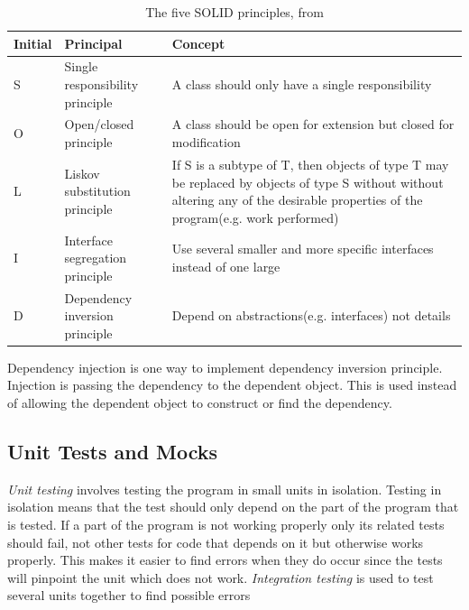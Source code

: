 \documentclass[10pt,a4paper]{report}
\begin{document}
\begin{table}[h]
\begin{tabular}{ l l p{2in}}
  \hline
  Initial & Principal & Concept\\
  \hline
  S & Single responsibility principle & A class should only have a single responsibility \\
  O & Open/closed principle & A class should be open for extension but closed for modification \\
  L & Liskov substitution principle & If S is a subtype of T, then objects of type T may be replaced by objects of type S without without altering any of the desirable properties of the program(e.g. work performed)\\
  I & Interface segregation principle & Use several smaller and more specific interfaces instead of one large \\
  D & Dependency inversion principle & Depend on abstractions(e.g. interfaces) not details \\
  \hline  
\end{tabular}
\caption{The five SOLID principles, from \cite{cleancode2008}}
\label{table:solid_table}
\end{table}

Dependency injection is one way to implement dependency inversion principle\cite{cleancode2008}. Injection is passing the dependency to the dependent object. This is used instead of allowing the dependent object to construct or find the dependency.

\subsection{Unit Tests and Mocks}
\emph{Unit testing} involves testing the program in small units in isolation. Testing in isolation means that the test should only depend on the part of the program that is tested. If a part of the program is not working properly only its related tests should fail, not other tests for code that depends on it but otherwise works properly. This makes it easier to find errors when they do occur since the tests will pinpoint the unit which does not work. \emph{Integration testing} is used to test several units together to find possible errors  

\end{document}
